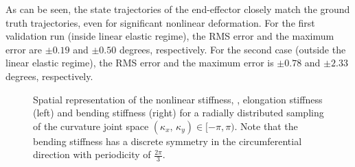 As can be seen, the state trajectories of the end-effector closely match the ground truth trajectories, even for significant nonlinear deformation. For the first validation run (inside linear elastic regime), the RMS error and the maximum error are $\pm0.19$ and $\pm 0.50$ degrees, respectively. For the second case (outside the linear elastic regime), the RMS error and the maximum error is $\pm0.78$ and $\pm 2.33$ degrees, respectively.

\begin{figure}[!t]
   \centering
   \ifx\printFigures\undefined
   \else
   
   
   \fi
   \vspace{-0.25cm}
   \caption{Spatial representation of the nonlinear stiffness, \ie,  elongation stiffness (left) and bending stiffness (right) for a radially distributed sampling of the curvature joint space $(\kappa_x,\,\kappa_y) \in [-\pi,\pi)$. Note that the bending stiffness has a discrete symmetry in the circumferential direction with periodicity of $\tfrac{2\pi}{3}$.}
   \vspace{-0.1cm}
   \label{fig:C2:openloop_2D}
 \end{figure}

